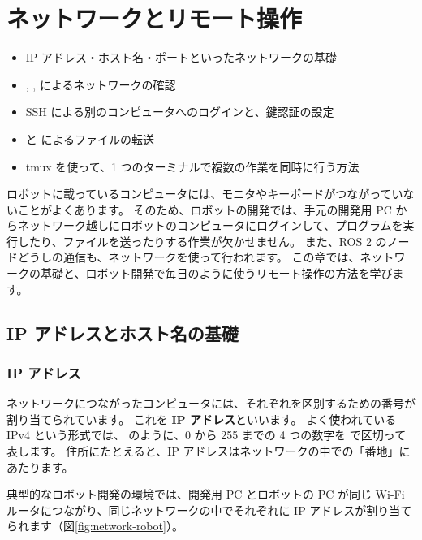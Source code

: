 \chapter{ネットワークとリモート操作}
\label{chap:network}

\begin{goalbox}
  \begin{itemize}
    \item IP アドレス・ホスト名・ポートといったネットワークの基礎
    \item {}, ,  によるネットワークの確認
    \item SSH による別のコンピュータへのログインと、鍵認証の設定
    \item {} と  によるファイルの転送
    \item tmux を使って、1 つのターミナルで複数の作業を同時に行う方法
  \end{itemize}
\end{goalbox}

ロボットに載っているコンピュータには、モニタやキーボードがつながっていないことがよくあります。
そのため、ロボットの開発では、手元の開発用 PC からネットワーク越しにロボットのコンピュータにログインして、プログラムを実行したり、ファイルを送ったりする作業が欠かせません。
また、ROS 2 のノードどうしの通信も、ネットワークを使って行われます。
この章では、ネットワークの基礎と、ロボット開発で毎日のように使うリモート操作の方法を学びます。

\section{IP アドレスとホスト名の基礎}
\label{sec:network-basics}

\subsection{IP アドレス}

ネットワークにつながったコンピュータには、それぞれを区別するための番号が割り当てられています。
これを \textbf{IP アドレス}といいます。
よく使われている IPv4 という形式では、 のように、0 から 255 までの 4 つの数字を  で区切って表します。
住所にたとえると、IP アドレスはネットワークの中での「番地」にあたります。

典型的なロボット開発の環境では、開発用 PC とロボットの PC が同じ Wi-Fi ルータにつながり、同じネットワークの中でそれぞれに IP アドレスが割り当てられます（図\ref{fig:network-robot}）。

